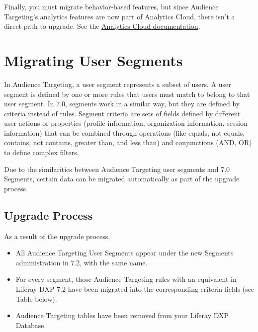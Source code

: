 Finally, you must migrate behavior-based features, but since Audience
Targeting's analytics features are now part of Analytics Cloud, there
isn't a direct path to upgrade. See the
\href{https://help.liferay.com/hc/en-us/articles/360006947671-Creating-Segments}{Analytics
Cloud documentation}.

\chapter{Migrating User Segments}\label{migrating-user-segments}

In Audience Targeting, a user segment represents a subset of users. A
user segment is defined by one or more rules that users must match to
belong to that user segment. In 7.0, segments work in a similar way, but
they are defined by criteria instead of rules. Segment criteria are sets
of fields defined by different user actions or properties (profile
information, organization information, session information) that can be
combined through operations (like equals, not equals, contains, not
contains, greater than, and less than) and conjunctions (AND, OR) to
define complex filters.

Due to the similarities between Audience Targeting user segments and 7.0
Segments, certain data can be migrated automatically as part of the
upgrade process.

\section{Upgrade Process}\label{upgrade-process}

As a result of the upgrade process,

\begin{itemize}
\tightlist
\item
  All Audience Targeting User Segments appear under the new Segments
  administration in 7.2, with the same name.
\item
  For every segment, those Audience Targeting rules with an equivalent
  in Liferay DXP 7.2 have been migrated into the corresponding criteria
  fields (see Table below).
\item
  Audience Targeting tables have been removed from your Liferay DXP
  Database.
\end{itemize}

\noindent\hrulefill

